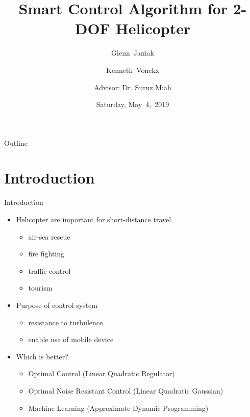 \documentclass{beamer}
\title[2-DOF Helicopter]{Smart Control Algorithm for 2-DOF Helicopter}
\author[G.~Janiak, K.~Vonckx]{Glenn~Janiak \and Kenneth~Vonckx \and
Advisor: Dr. Suruz Miah}
\institute[Bradley University] %
{
  Department of Electrical and Computer Engineering\\
  Bradley University\\
  1501 W. Bradley Avenue\\
  Peoria, IL, 61625, USA
}
\date[May~4,~2019]{Saturday, May~4,~2019}
\begin{document}
\begin{frame}
  \titlepage
\end{frame}

\begin{frame}{Outline} 
  \tableofcontents%
\end{frame}

\section{Introduction}

\begin{frame}{Introduction}{}
    \begin{itemize}
        \item Helicopter are important for short-distance travel
            \begin{itemize}
                \item air-sea rescue
                \item fire fighting
                \item traffic control
                \item tourism
            \end{itemize}
        \item Purpose of control system
            \begin{itemize}
                \item resistance to turbulence
                \item enable use of mobile device
            \end{itemize}
        \item Which is better?
            \begin{itemize}
                \item Optimal Control (Linear Quadratic Regulator)
                \item Optimal Noise Resistant Control (Linear Quadratic Gaussian) 
                \item Machine Learning (Approximate Dynamic Programming)
            \end{itemize}
    \end{itemize}
\end{frame}
\end{document}
